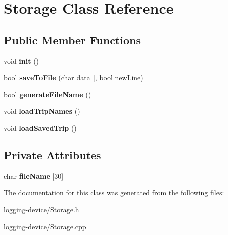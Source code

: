 \hypertarget{class_storage}{}\section{Storage Class Reference}
\label{class_storage}
\subsection*{Public Member Functions}
\begin{DoxyCompactItemize}
\item 
\mbox{\label{class_storage_a98b01eb20a64a4bf4127685147f7f6f1}} 
void {\bfseries init} ()
\item 
\mbox{\label{class_storage_a044a17325b2917afca49aa19ddb488f6}} 
bool {\bfseries save\+To\+File} (char data\mbox{[}$\,$\mbox{]}, bool new\+Line)
\item 
\mbox{\label{class_storage_a571ce9630665d9407ffbaeff55c47b0a}} 
bool {\bfseries generate\+File\+Name} ()
\item 
\mbox{\label{class_storage_a4831b2e8ecfa22da6971f5a8690cc4e3}} 
void {\bfseries load\+Trip\+Names} ()
\item 
\mbox{\label{class_storage_af56ca8289ed925300e3385114c561eec}} 
void {\bfseries load\+Saved\+Trip} ()
\end{DoxyCompactItemize}
\subsection*{Private Attributes}
\begin{DoxyCompactItemize}
\item 
\mbox{\label{class_storage_a7c3e886a0b8395c2045ab4f7e04481e1}} 
char {\bfseries file\+Name} \mbox{[}30\mbox{]}
\end{DoxyCompactItemize}


The documentation for this class was generated from the following files\+:\begin{DoxyCompactItemize}
\item 
logging-\/device/Storage.\+h\item 
logging-\/device/Storage.\+cpp\end{DoxyCompactItemize}
